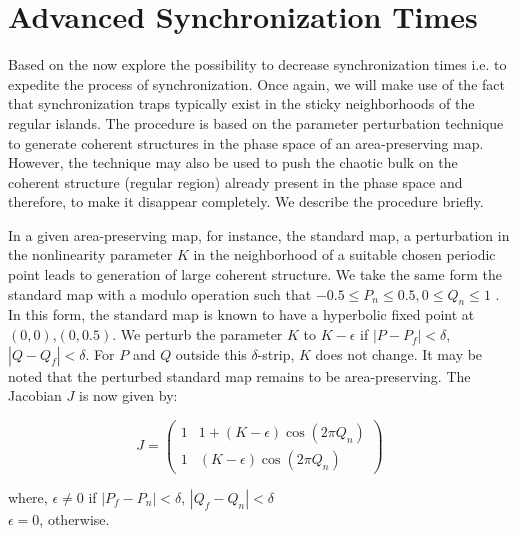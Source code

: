 \documentclass[reprint,superscriptaddress,amsmath,amssymb,aps,pre]{revtex4-1}
\begin{document}
\section{Advanced Synchronization Times}
\label{sec:advanced}
Based on the now explore the possibility to decrease synchronization times 
i.e. to expedite the process of synchronization. Once again, we will make use 
of the fact that synchronization traps typically exist in the sticky 
neighborhoods of the regular islands.  The procedure is based on the parameter 
perturbation technique to generate coherent structures in the phase space of 
an area-preserving map. However, the technique may also be used to push the 
chaotic bulk on the coherent structure (regular region) already present in the 
phase space and therefore, to make it disappear completely.  We describe the 
procedure briefly. 

In a given area-preserving map, for instance, the  standard map, a  
perturbation in the nonlinearity parameter $K$ in the neighborhood of a 
suitable chosen periodic point leads to generation of large coherent 
structure.   We take the same form the standard map with a modulo operation 
such that $-0.5 \leq P_n \leq 0.5, 0\leq Q_n \leq 1$ . In this form, the 
standard map is known to have a hyperbolic fixed point at 
$(0,0)$,$(0,0.5)$. We perturb the parameter $K$ to $K-\epsilon$ if $|P - P_f| 
< \delta$, $|Q-Q_f| < \delta$. For $P$ and $Q$ outside this $\delta$-strip, 
$K$ does not change.  It may be noted that the perturbed standard map remains 
to be area-preserving. The Jacobian $J$ is now given by: 

\begin{minipage}[t]{0.45\textwidth}
	\centering
	\[ J = \left( \begin{array}{cc}
	1 & 1 + (K-\epsilon)\cos(2\pi Q_n)   \\
	1 & (K-\epsilon)\cos(2\pi Q_n) \end{array} \right)\] 
\end{minipage}

\vspace{0.4cm}
	where, $ \epsilon \neq 0$ if $|P_f - P_n| < \delta$, $|Q_f - Q_n| < \delta$\\ $\epsilon = 0$, otherwise.\\
\end{document}
